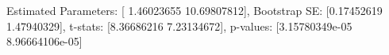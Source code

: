 Estimated Parameters: [ 1.46023655 10.69807812], Bootstrap SE: [0.17452619 1.47940329], t-stats: [8.36686216 7.23134672], p-values: [3.15780349e-05 8.96664106e-05]